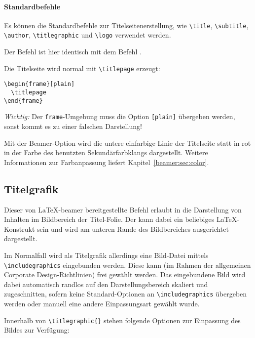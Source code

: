 \paragraph{Standardbefehle}

Es können die Standardbefehle zur Titelseitenerstellung, wie
\lstinline{\title},
\lstinline{\subtitle},
\lstinline{\author},
\lstinline{\titlegraphic}
und \lstinline{\logo} verwendet werden.
\begin{hint}
  Der Befehl  ist hier identisch mit dem Befehl .
\end{hint}

Die Titelseite wird normal mit \lstinline{\titlepage} erzeugt:

\begin{lstlisting}
\begin{frame}[plain]
  \titlepage
\end{frame}
\end{lstlisting}

\emph{Wichtig:} Der \lstinline{frame}-Umgebung muss die Option
\lstinline{[plain]} übergeben werden,
sonst kommt es zu einer falschen Darstellung!

\begin{Declaration}
\end{Declaration}

Mit der Beamer-Option  wird die untere einfarbige Linie
der Titelseite statt in rot in der Farbe des benutzten Sekundärfarbklangs
dargestellt. Weitere Informationen zur Farbanpassung liefert
Kapitel~\ref{beamer:sec:color}.


\subsection{Titelgrafik}

\begin{Declaration}
\end{Declaration}

\begin{sloppypar}
Dieser von \LaTeX-beamer bereitgestellte Befehl erlaubt in \tubslatex
die Darstellung von Inhalten im Bildbereich der Titel-Folie.
Der  kann dabei ein beliebiges \LaTeX-Konstrukt sein
und wird am unteren Rande des Bildbereiches ausgerichtet dargestellt.

Im Normalfall wird als Titelgrafik allerdings eine Bild-Datei mittels
\lstinline{\includegraphics} eingebunden werden.
Diese kann (im Rahmen der allgemeinen Corporate Design-Richtlinien)%
frei gewählt werden.
Das eingebundene Bild wird dabei automatisch randlos
auf den Darstellungsbereich skaliert und zugeschnitten, sofern keine
Standard-Optionen an \lstinline{\includegraphics} übergeben werden oder
manuell eine andere Einpassungsart gewählt wurde.

Innerhalb von \lstinline!\titlegraphic{}! stehen folgende
Optionen zur Einpassung des Bildes zur Verfügung:
\end{sloppypar}

